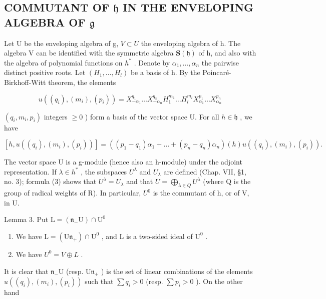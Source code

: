\subsection{\texorpdfstring{COMMUTANT OF \(\mathfrak{h}\) IN THE ENVELOPING ALGEBRA OF \(\mathfrak{g}\)}{COMMUTANT OF \textbackslash mathfrak\{h\} IN THE ENVELOPING ALGEBRA OF \textbackslash mathfrak\{g\}}}

Let U be the enveloping algebra of g, \(V \subset U\) the enveloping algebra of h. The algebra V can be identified with the symmetric algebra \(\mathbf{S}(\mathfrak{h})\) of h, and also with the algebra of polynomial functions on \(h^{*}\) . Denote by \(\alpha_{1},\ldots,\alpha_{n}\) the pairwise distinct positive roots. Let \((H_{1},\ldots,H_{l})\) be a basis of h. By the Poincaré-Birkhoff-Witt theorem, the elements

\[
u ((q _ {i}), (m _ {i}), (p _ {i})) = X _ {- \alpha_ {1}} ^ {q _ {1}} \dots X _ {- \alpha_ {n}} ^ {q _ {n}} H _ {1} ^ {m _ {1}} \dots H _ {l} ^ {m _ {l}} X _ {\alpha_ {1}} ^ {p _ {1}} \dots X _ {\alpha_ {n}} ^ {p _ {n}}
\]

\((q_{i},m_{i},p_{i})\) integers \(\geq 0\) ) form a basis of the vector space U. For all \(h\in \mathfrak{h}\) , we have

\[
[ h, u ((q _ {i}), (m _ {i}), (p _ {i})) ] = ((p _ {1} - q _ {1}) \alpha_ {1} + \dots + (p _ {n} - q _ {n}) \alpha_ {n}) (h) u ((q _ {i}), (m _ {i}), (p _ {i})).\tag{3}
\]

The vector space U is a g-module (hence also an h-module) under the adjoint representation. If \(\lambda \in h^{*}\) , the subspaces \(U^{\lambda}\) and \(U_{\lambda}\) are defined (Chap. VII, §1, no. 3); formula (3) shows that \(U^{\lambda} = U_{\lambda}\) and that \(U = \bigoplus_{\lambda \in Q} U^{\lambda}\) (where Q is the group of radical weights of R). In particular, \(U^{0}\) is the commutant of h, or of V, in U.

Lemma 3. Put \(\mathrm{L} = (\mathfrak{n}_{-}\mathrm{U})\cap \mathrm{U}^{0}\)

\begin{enumerate}
\def\labelenumi{(\roman{enumi})}
\item
  We have \(\mathrm{L} = (\mathrm{U}\mathfrak{n}_{+})\cap \mathrm{U}^{0}\) , and \(\mathrm{L}\) is a two-sided ideal of \(\mathrm{U}^0\) .
\item
  We have \(U^{0} = V \oplus L\) .
\end{enumerate}

It is clear that \(\mathfrak{n}_{-}\mathrm{U}\) (resp. \(\mathrm{U}\mathfrak{n}_{+}\) ) is the set of linear combinations of the elements \(u((q_{i}),(m_{i}),(p_{i}))\) such that \(\sum q_{i}>0\) (resp. \(\sum p_{i}>0\) ). On the other hand


